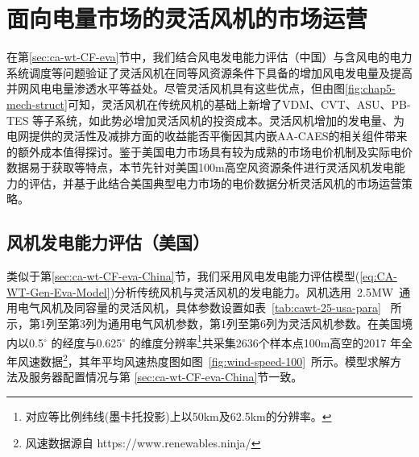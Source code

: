 \section{面向电量市场的灵活风机的市场运营}
\label{sec:ca-wt-self-schedule}
在第\ref{sec:ca-wt-CF-eva}节中，我们结合风电发电能力评估（中国）与含风电的电力系统调度等问题验证了灵活风机在同等风资源条件下具备的增加风电发电量及提高并网风电电量渗透水平等益处。尽管灵活风机具有这些优点，但由图\ref{fig:chap5-mech-struct}可知，灵活风机在传统风机的基础上新增了VDM、CVT、ASU、PB-TES 等子系统，如此势必增加灵活风机的投资成本。灵活风机增加的发电量、为电网提供的灵活性及减排方面的收益能否平衡因其内嵌AA-CAES的相关组件带来的额外成本值得探讨。鉴于美国电力市场具有较为成熟的市场电价机制及实际电价数据易于获取等特点，本节先针对美国100m高空风资源条件进行灵活风机发电能力的评估，并基于此结合美国典型电力市场的电价数据分析灵活风机的市场运营策略。

\subsection{风机发电能力评估（美国）}
\label{sec:ca-wt-CF-eva-US}
类似于第\ref{sec:ca-wt-CF-eva-China}节，我们采用风电发电能力评估模型(\ref{eq:CA-WT-Gen-Eva-Model})分析传统风机与灵活风机的发电能力。风机选用~2.5MW~通用电气风机及同容量的灵活风机，具体参数设置如表~\ref{tab:cawt-25-usa-para}~ 所示，第1列至第3列为通用电气风机参数，第1列至第6列为灵活风机参数。在美国境内以0.5$^\circ$ 的经度与0.625$^\circ$ 的维度分辨率\footnote{对应等比例纬线(墨卡托投影)上以50km及62.5km的分辨率。}共采集2636个样本点100m高空的2017 年全年风速数据\footnote{风速数据源自 https://www.renewables.ninja/}，其年平均风速热度图如图~\ref{fig:wind-speed-100}~所示。模型求解方法及服务器配置情况与第
\ref{sec:ca-wt-CF-eva-China}节一致。

